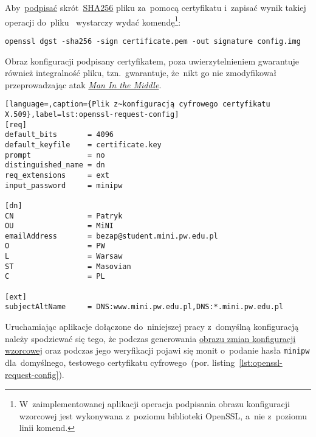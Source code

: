 \documentclass[thesis]{subfiles}
\begin{document}
Aby~\href{http://stackoverflow.com/questions/10782826/digital-signature-for-a-file-using-openssl}{podpisać} skrót~\href{https://en.wikipedia.org/wiki/SHA-2}{SHA256} pliku  za~pomocą certyfikatu  i~zapisać wynik takiej operacji do~pliku~ wystarczy wydać komendę\footnote{W~zaimplementowanej aplikacji operacja podpisania obrazu konfiguracji wzorcowej jest wykonywana z~poziomu biblioteki OpenSSL, a~nie z~poziomu linii komend.}:\mynobreakpar

\begin{center}
	\texttt{openssl dgst -sha256 -sign certificate.pem -out signature config.img}
\end{center}

Obraz konfiguracji podpisany certyfikatem, poza uwierzytelnieniem gwarantuje również integralność pliku, tzn.~gwarantuje, że~nikt go nie zmodyfikował przeprowadzając atak \emph{\hyperlink{itm:mitm}{Man In the Middle}}.

\begin{lstlisting}[language=,caption={Plik z~konfiguracją cyfrowego certyfikatu X.509},label=lst:openssl-request-config]
[req]
default_bits       = 4096
default_keyfile    = certificate.key
prompt             = no
distinguished_name = dn
req_extensions     = ext
input_password     = minipw

[dn]
CN                 = Patryk
OU                 = MiNI
emailAddress       = bezap@student.mini.pw.edu.pl
O                  = PW
L                  = Warsaw
ST                 = Masovian
C                  = PL

[ext]
subjectAltName     = DNS:www.mini.pw.edu.pl,DNS:*.mini.pw.edu.pl
\end{lstlisting}

Uruchamiając aplikacje dołączone do~niniejszej pracy z~domyślną konfiguracją należy spodziewać się tego, że podczas generowania \hyperref[sec:obraz-zmian-konfiguracji]{obrazu zmian konfiguracji wzorcowej} oraz podczas jego weryfikacji pojawi się monit o~podanie hasła \texttt{minipw} dla~domyślnego, testowego certyfikatu cyfrowego~(por. listing~\ref{lst:openssl-request-config}).
\end{document}
